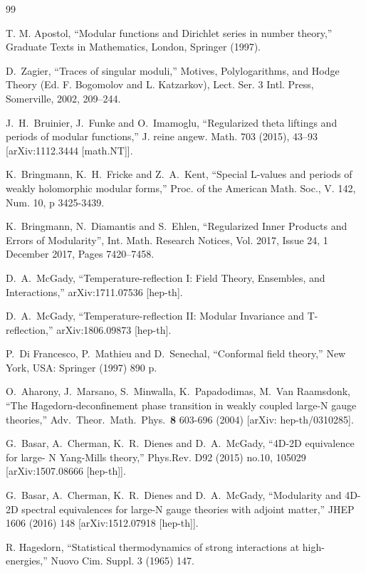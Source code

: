 \documentclass[11pt,a4paper]{article}
\begin{document}
\begin{thebibliography}{99}


T. M. Apostol, 
``Modular functions and Dirichlet series in number theory,''
Graduate Texts in Mathematics, London, Springer (1997).


D.~Zagier, ``Traces of singular moduli,''
Motives, Polylogarithms, and Hodge Theory (Ed. F. Bogomolov and L. Katzarkov), Lect. Ser. 3 Intl. Press, Somerville, 2002, 209--244.


J.~H.~Bruinier, J.~Funke and O.~Imamoglu,
``Regularized theta liftings and periods of modular functions,''
J. reine angew. Math. 703 (2015), 43--93
[arXiv:1112.3444 [math.NT]].


K.~Bringmann, K.~H.~Fricke and Z.~A.~Kent,
``Special L-values and periods of weakly holomorphic modular forms,''
Proc. of the American Math. Soc.,
V. 142, Num. 10, p 3425-3439.


K.~Bringmann, N.~Diamantis and S.~Ehlen,
``Regularized Inner Products and Errors of Modularity'',
Int. Math. Research Notices, Vol. 2017, Issue 24, 1 December 2017, Pages 7420--7458.


D.~A.~McGady,
``Temperature-reflection I: Field Theory, Ensembles, and Interactions,'' 
arXiv:1711.07536 [hep-th].


D.~A.~McGady,
``Temperature-reflection II: Modular Invariance and T-reflection,'' 
arXiv:1806.09873 [hep-th].


P.~Di Francesco, P.~Mathieu and D.~Senechal,  
``Conformal field theory,''
New York, USA: Springer (1997) 890 p.


O.~Aharony, J.~Marsano, S.~Minwalla, K.~Papadodimas, M.~Van Raamsdonk, 
``The Hagedorn-deconfinement phase transition in weakly coupled large-N gauge theories,''
Adv.~Theor.~Math.~Phys.~{\bf 8} 603-696 (2004)
[arXiv: hep-th/0310285].


G.~Basar, A.~Cherman, K.~R.~Dienes and D.~A.~McGady,
``4D-2D equivalence for large- N Yang-Mills theory,''
Phys.Rev. D92 (2015) no.10, 105029 [arXiv:1507.08666 [hep-th]].


G.~Basar, A.~Cherman, K.~R.~Dienes and D.~A.~McGady,
``Modularity and 4D-2D spectral equivalences for large-N gauge theories with adjoint matter,''
JHEP 1606 (2016) 148 [arXiv:1512.07918 [hep-th]].


R. Hagedorn, 
``Statistical thermodynamics of strong interactions at high-energies,'' 
Nuovo Cim. Suppl. 3 (1965) 147.


\end{thebibliography}
\end{document}
